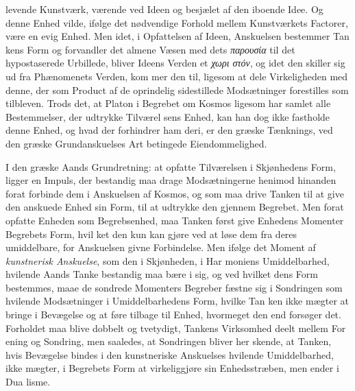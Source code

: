 \documentclass[12pt,a4paper]{book}
\newcommand{\gk}[1]{\textit{#1}}
\begin{document}
levende Kunstværk, værende ved Ideen og besjælet af den
iboende Idee. Og denne Enhed vilde, ifølge det nødvendige
Forhold mellem Kunstværkets Factorer, være en evig Enhed.
Men idet, i Opfattelsen af Ideen, Anskuelsen bestemmer Tan\-%
kens Form og forvandler det almene Væsen med dets \gk{παρουσία}
til det hypostaserede Urbillede, bliver Ideens Verden et \gk{χωρι\-%
στόν}, og idet den skiller sig ud fra Phænomenets Verden, kom\-%
mer den til, ligesom at dele Virkeligheden med denne, der som
Product af de oprindelig sidestillede Modsætninger forestilles
som tilbleven. Trods det, at Platon i Begrebet om Kosmos
ligesom har samlet alle Bestemmelser, der udtrykke Tilværel\-%
sens Enhed, kan han dog ikke fastholde denne Enhed, og hvad
der forhindrer ham deri, er den græske Tænknings, ved den
græske Grundanskuelses Art betingede Eiendommelighed.

I den græske Aands Grundretning: at opfatte Tilværelsen
i Skjønhedens Form, ligger en Impuls, der bestandig maa
drage Modsætningerne henimod hinanden forat forbinde dem i
Anskuelsen af Kosmos, og som maa drive Tanken til at give
den anskuede Enhed sin Form, til at udtrykke den gjennem
Begrebet. Men forat opfatte Enheden som Begrebsenhed, maa
Tanken først give Enhedens Momenter Begrebets Form, hvil\-%
ket den kun kan gjøre ved at løse dem fra deres umiddelbare,
for Anskuelsen givne Forbindelse. Men ifølge det Moment af
\emph{kunstnerisk Anskuelse}, som den i Skjønheden, i Har\-%
moniens Umiddelbarhed, hvilende Aands Tanke bestandig maa
bære i sig, og ved hvilket dens Form bestemmes, maae de
sondrede Momenters Begreber fæstne sig i Sondringen som
hvilende Modsætninger i Umiddelbarhedens Form, hvilke Tan\-%
ken ikke mægter at bringe i Bevægelse og at føre tilbage til
Enhed, hvormeget den end forsøger det. Forholdet maa blive
dobbelt og tvetydigt, Tankens Virksomhed deelt mellem For\-%
ening og Sondring, men saaledes, at Sondringen bliver her\-%
skende, at Tanken, hvis Bevægelse bindes i den kunstneriske
Anskuelses hvilende Umiddelbarhed, ikke mægter, i Begrebets
Form at virkeliggjøre sin Enhedsstræben, men ender i Dua\-%
lisme.
\end{document}
